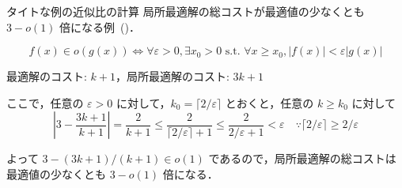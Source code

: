 \documentclass[aspectratio=169]{beamer}
\begin{document}
\begin{frame}[label=tight-example-analysis]{タイトな例の近似比の計算}
	局所最適解の総コストが最適値の少なくとも \(3 - o(1)\) 倍になる例~(\cite{arya2004local})．

	\begin{definition}[スモールオー]
		\[
			f(x) \in o(g(x)) \iff \forall \varepsilon > 0, \exists x_0 > 0 \text{ s.t. } \forall x \ge x_0, |f(x)| < \varepsilon |g(x)|
		\]
	\end{definition}

	最適解のコスト: \(k + 1\)，局所最適解のコスト: \(3k + 1\)

	ここで，任意の \(\varepsilon > 0\) に対して，\(k_0 = \lceil 2/\varepsilon \rceil\) とおくと，任意の \(k \ge k_0\) に対して
	\[
		\left| 3 - \frac{3k + 1}{k + 1} \right| = \frac{2}{k + 1} \le \frac{2}{\lceil 2/\varepsilon \rceil + 1} \le \frac{2}{2/\varepsilon + 1} < \varepsilon \quad \because \lceil 2/\varepsilon \rceil \ge 2/\varepsilon
	\]

	よって \(3 - (3k + 1) / (k + 1) \in o(1)\) であるので，局所最適解の総コストは最適値の少なくとも \(3 - o(1)\) 倍になる．
	\hfill \hyperlink{tight-example}{}
\end{frame}
\end{document}
